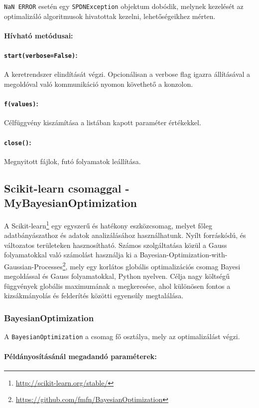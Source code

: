 \texttt{NaN ERROR} esetén egy \texttt{SPDNException} objektum dobódik, melynek kezelését az optimalizáló algoritmusok hivatottak kezelni, lehetőségeikhez mérten.
\paragraph{Hívható metódusai:}
\paragraph{\texttt{start(verbose=False)}:} A keretrendszer elindítását végzi. Opcionálisan a verbose flag igazra állításával a megoldóval való kommunikáció nyomon követhető a konzolon.
\paragraph{\texttt{f(values)}:} Célfüggvény kiszámítása a listában kapott paraméter értékekkel.
\paragraph{\texttt{close()}:} Megnyitott fájlok, futó folyamatok leállítása.

\subsection{Scikit-learn csomaggal - MyBayesianOptimization}
A Scikit-learn\footnote{\url{http://scikit-learn.org/stable/}} egy egyszerű és hatékony eszközcsomag, melyet főleg adatbányászathoz és adatok analizálásához használhatunk. Nyílt forráskódú, és változatos területeken hasznosítható. Számos szolgáltatása közül a Gauss folyamatokkal való számolást használja ki a Bayesian-Optimization-with-Gaussian-Processes\footnote{\url{https://github.com/fmfn/BayesianOptimization}}, mely egy korlátos globális optimalizációs csomag Bayesi megoldással és Gauss folyamatokkal, Python nyelven. Célja nagy költségű függvények globális maximumának a megkeresése, ahol különösen fontos a kizsákmányolás és felderítés közötti egyensúly megtalálása.

\subsubsection{BayesianOptimization}

A \texttt{BayesianOptimization} a csomag fő osztálya, mely az optimalizálást végzi.
\paragraph{Példányosításánál megadandó paraméterek:}
